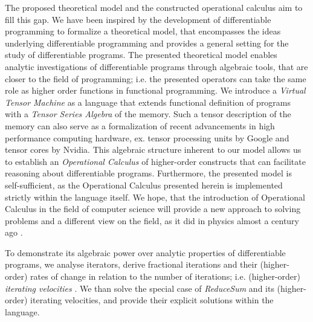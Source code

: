 The proposed theoretical model and the constructed operational calculus aim to
fill this gap. We have been inspired by the development of differentiable programming to
formalize a theoretical model, that encompasses the ideas underlying
differentiable programming and provides a general setting for the study of
differentiable programs. The presented theoretical model enables analytic
investigations of differentiable programs through algebraic tools, that are
closer to the field of programming; i.e. the presented operators can take the
same role as higher order functions in functional programming. We introduce a
\emph{Virtual Tensor Machine} as a language that extends functional definition
of programs with a \emph{Tensor Series Algebra} of the memory. Such a tensor
description of the memory can also serve as a formalization of recent
advancements in high performance computing hardware, ex. tensor processing
units by Google and tensor cores by Nvidia. This algebraic structure inherent
to our model allows us to establish an \emph{Operational Calculus} of
higher-order constructs that can facilitate reasoning about differentiable
programs. Furthermore, the presented model is self-sufficient, as the
Operational Calculus presented herein is implemented strictly within the
language itself. We hope, that the introduction of Operational Calculus in the
field of computer science will provide a new approach to solving problems and a
different view on the field, as it did in physics almost a century ago
\cite{OpCalc}.

To demonstrate its algebraic power over analytic properties of
differentiable programs, we analyse iterators, derive fractional iterations and
their (higher-order) rates of change in relation to the number of iterations;
i.e. (higher-order) \emph{ iterating velocities }. We than solve the special
case of \emph{ReduceSum} and its (higher-order) iterating velocities, and
provide their explicit solutions within the language.


